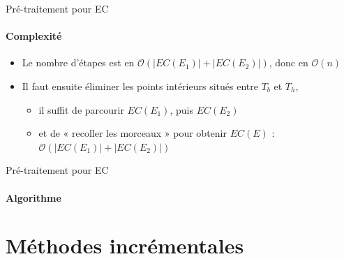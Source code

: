 \documentclass[aspectratio=1610,francais,envcountsect]{beamer}
\begin{document}
\begin{frame}[allowframebreaks]{Pré-traitement pour EC
    \insertcontinuationtext}

  \framesubtitle{Complexité}
  
  \begin{itemize}
  \item Le nombre d’étapes est en $\mathcal{O}(|EC(E_1)| +|EC(E_2)|)$,
    donc en $\mathcal{O}(n)$
  \item Il faut ensuite éliminer les points intérieurs situés entre
    $T_b$ et $T_h$,
    \begin{itemize}
    \item il suffit de parcourir $EC(E_1)$, puis $EC(E_2)$
    \item et de « recoller les morceaux » pour obtenir $EC(E)$ :
      $\mathcal{O}(|EC(E_1)| + |EC(E_2)|)$
    \end{itemize}

  \end{itemize}
  
\end{frame}
\begin{frame}[allowframebreaks]{Pré-traitement pour EC
    \insertcontinuationtext}

  \framesubtitle{Algorithme}

  \begin{algorithm}[H]
    \DontPrintSemicolon {}
      
  \end{algorithm}

      
\end{frame}


\section{Méthodes incrémentales}
\end{document}
